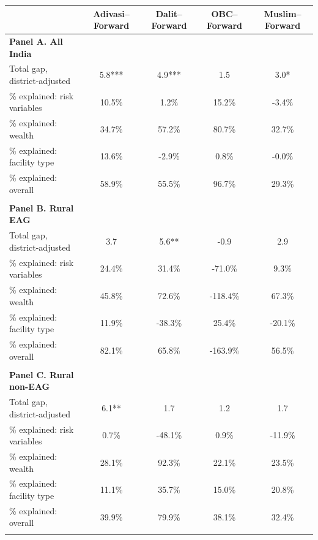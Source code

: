 \begin{tabular}{lcccc}
\hline
 & Adivasi--Forward & Dalit--Forward & OBC--Forward & Muslim--Forward \\
\hline
\textbf{Panel A. All India}&&&&\\
Total gap, district-adjusted&5.8***&4.9***&1.5&3.0*\\
\% explained: risk variables&10.5\%&1.2\%&15.2\%&-3.4\%\\
\% explained: wealth&34.7\%&57.2\%&80.7\%&32.7\%\\
\% explained: facility type&13.6\%&-2.9\%&0.8\%&-0.0\%\\
\% explained: overall&58.9\%&55.5\%&96.7\%&29.3\%\\
&&&&\\
\textbf{Panel B. Rural EAG}&&&&\\
Total gap, district-adjusted&3.7&5.6**&-0.9&2.9\\
\% explained: risk variables&24.4\%&31.4\%&-71.0\%&9.3\%\\
\% explained: wealth&45.8\%&72.6\%&-118.4\%&67.3\%\\
\% explained: facility type&11.9\%&-38.3\%&25.4\%&-20.1\%\\
\% explained: overall&82.1\%&65.8\%&-163.9\%&56.5\%\\
&&&&\\
\textbf{Panel C. Rural non-EAG}&&&&\\
Total gap, district-adjusted&6.1**&1.7&1.2&1.7\\
\% explained: risk variables&0.7\%&-48.1\%&0.9\%&-11.9\%\\
\% explained: wealth&28.1\%&92.3\%&22.1\%&23.5\%\\
\% explained: facility type&11.1\%&35.7\%&15.0\%&20.8\%\\
\% explained: overall&39.9\%&79.9\%&38.1\%&32.4\%\\
&&&&\\
\hline
\end{tabular}
